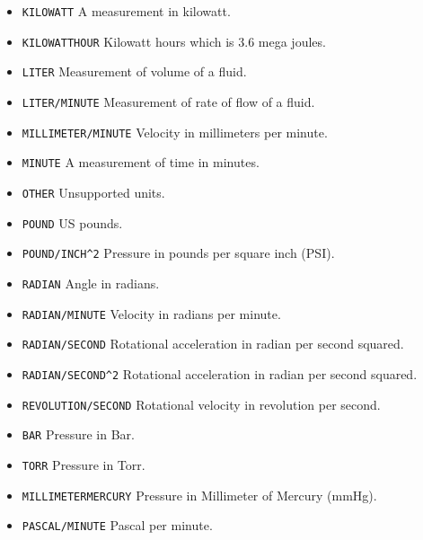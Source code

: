 \begin{itemize}
\begin{itemize}
\item \texttt{KILOWATT} \newline A measurement in kilowatt. 
\item \texttt{KILOWATT\textunderscore HOUR} \newline Kilowatt hours which is 3.6 mega joules. 
\item \texttt{LITER} \newline Measurement of volume of a fluid. 
\item \texttt{LITER/MINUTE} \newline Measurement of rate of flow of a fluid. 
\item \texttt{MILLIMETER/MINUTE} \newline Velocity in millimeters per minute. 
\item \texttt{MINUTE} \newline A measurement of time in minutes. 
\item \texttt{OTHER} \newline Unsupported units. 
\item \texttt{POUND} \newline US pounds. 
\item \texttt{POUND/INCH\^{}2} \newline Pressure in pounds per square inch (PSI). 
\item \texttt{RADIAN} \newline Angle in radians. 
\item \texttt{RADIAN/MINUTE} \newline Velocity in radians per minute. 
\item \texttt{RADIAN/SECOND} \newline Rotational acceleration in radian per second squared. 
\item \texttt{RADIAN/SECOND\^{}2} \newline Rotational acceleration in radian per second squared. 
\item \texttt{REVOLUTION/SECOND} \newline Rotational velocity in revolution per second. 
\item \texttt{BAR} \newline Pressure in Bar. 
\item \texttt{TORR} \newline Pressure in Torr. 
\item \texttt{MILLIMETER\textunderscore MERCURY} \newline Pressure in Millimeter of Mercury (mmHg). 
\item \texttt{PASCAL/MINUTE} \newline Pascal per minute. 
\end{itemize}



\end{itemize}
